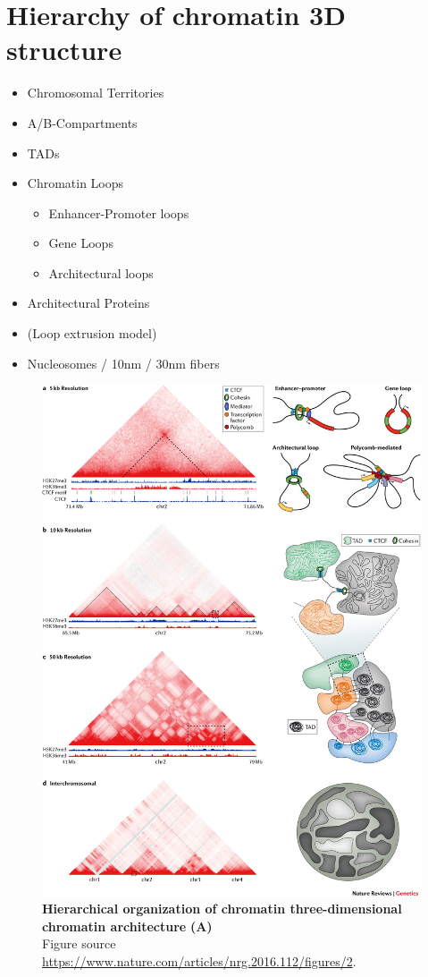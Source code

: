 \documentclass[a4paper,twoside=true,openright,parskip=full,chapterprefix=true,11pt,headings=normal,bibliography=totoc,listof=totoc,titlepage=on,captions=tableabove,draft=false]{scrreprt}
\providecommand{\tightlist}{%
  \setlength{\itemsep}{0pt}\setlength{\parskip}{0pt}}
\theoremstyle{definition}
\theoremstyle{definition}
\theoremstyle{definition}
\theoremstyle{remark}
\begin{document}
\section{Hierarchy of chromatin 3D
structure}\label{hierarchy-of-chromatin-3d-structure}

\begin{itemize}
\tightlist
\item
  Chromosomal Territories
\item
  A/B-Compartments
\item
  TADs
\item
  Chromatin Loops

  \begin{itemize}
  \tightlist
  \item
    Enhancer-Promoter loops
  \item
    Gene Loops
  \item
    Architectural loops
  \end{itemize}
\item
  Architectural Proteins
\item
  (Loop extrusion model)
\item
  Nucleosomes / 10nm / 30nm fibers
\end{itemize}

\begin{figure}

{\centering \includegraphics[width=0.8\linewidth]{figures/Bonev2016Fig2} 

}

\caption{\textbf{Hierarchical organization of chromatin
three-dimensional chromatin architecture} \textbf{(A)}\\
Figure source \citep{Bonev2016}
\url{https://www.nature.com/articles/nrg.2016.112/figures/2}.}\label{fig:GenomeHierarchy}
\end{figure}
\end{document}
